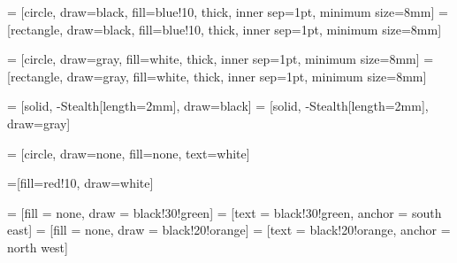 
 = [circle, draw=black, fill=blue!10, thick,
                 inner sep=1pt, minimum size=8mm]
 = [rectangle, draw=black, fill=blue!10, thick,
                 inner sep=1pt, minimum size=8mm]

 = [circle, draw=gray, fill=white, thick,
                  inner sep=1pt, minimum size=8mm]
 = [rectangle, draw=gray, fill=white, thick,
                  inner sep=1pt, minimum size=8mm]

 = [solid, -{Stealth[length=2mm]}, draw=black]
 = [solid, -{Stealth[length=2mm]}, draw=gray]


 = [circle, draw=none, fill=none, text=white]

=[fill=red!10, draw=white]

    = [fill = none, draw = black!30!green]
   = [text = black!30!green, anchor = south east]
  = [fill = none, draw = black!20!orange]
 = [text = black!20!orange, anchor = north west]